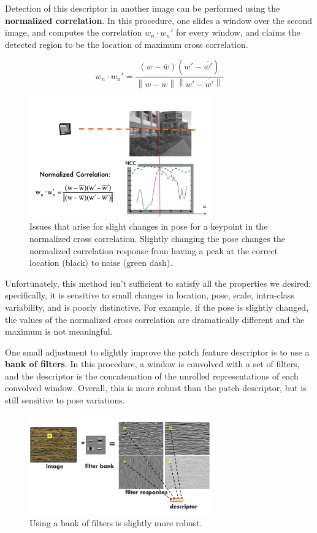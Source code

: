 \documentclass[a4paper, 12pt]{article}
\newcommand{\norm}[1]{\left\lVert#1\right\rVert}
\numberwithin{equation}{section}
\begin{document}
Detection of this descriptor in another image can be performed using the \textbf{normalized correlation}. In this procedure, one slides a window over the second image, and computes the correlation $w_n \cdot w_n'$ for every window, and claims the detected region to be the location of maximum cross correlation.  

$$ w_n \cdot w_n' = \frac{(w - \bar{w})(w' - \bar{w'})}{\norm{w - \bar{w}}\norm{w' - \bar{w'}}}$$

\begin{figure}
\centering
\includegraphics[width=0.7\textwidth]{ncc}
\caption{Issues that arise for slight changes in pose for a keypoint in the normalized cross correlation. Slightly changing the pose changes the normalized correlation response from having a peak at the correct location (black) to noise (green dash).}
\end{figure}

Unfortunately, this method isn't sufficient to satisfy all the properties we desired; specifically, it is sensitive to small changes in location, pose, scale, intra-class variability, and is poorly distinctive. For example, if the pose is slightly changed, the values of the normalized cross correlation are dramatically different and the maximum is not meaningful. 

One small adjustment to slightly improve the patch feature descriptor is to use a \textbf{bank of filters}. In this procedure, a window is convolved with a set of filters, and the descriptor is the concatenation of the unrolled representations of each convolved window. Overall, this is more robust than the patch descriptor, but is still sensitive to pose variations. 

\begin{figure}[h]
\centering
\includegraphics[width=0.7\textwidth]{filter_bank}
\caption{Using a bank of filters is slightly more robust.}
\end{figure}
\end{document}
